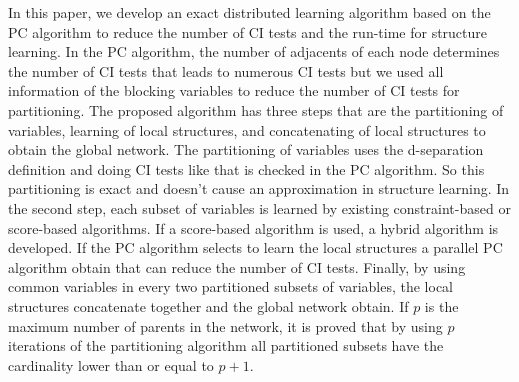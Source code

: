 \documentclass{article}
\begin{document}

In this paper, we develop an exact distributed learning algorithm based on the PC algorithm to reduce the number of CI tests and the run-time for structure learning. 
In the PC algorithm, the number of adjacents of each node determines the number of CI tests that leads to numerous CI tests but we used all information of the blocking variables to reduce the number of CI tests for partitioning.
The proposed algorithm has three steps that are the partitioning of variables, learning of local structures, and concatenating of local structures to obtain the global network.
The partitioning of variables uses the d-separation definition and doing CI tests like that is checked in the PC algorithm.
So this partitioning is exact and doesn't cause an approximation in structure learning.
In the second step, each subset of variables is learned by existing constraint-based or score-based algorithms.
If a score-based algorithm is used, a hybrid algorithm is developed.
If the PC algorithm selects to learn the local structures a parallel PC algorithm obtain that can reduce the number of CI tests.
Finally, by using common variables in every two partitioned subsets of variables, the local structures concatenate together and the global network obtain.
If $p$ is the maximum number of parents in the network, it is proved that by using $p$ iterations of the partitioning algorithm all partitioned subsets have the cardinality lower than or equal to $p+1$.
\end{document}
